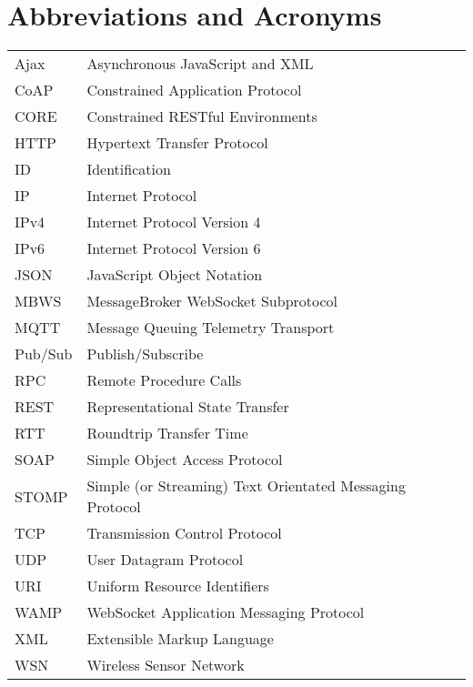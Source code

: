 \chapter*{Abbreviations and Acronyms}


\noindent
\begin{longtable}{@{}p{}p{}@{}}
Ajax & Asynchronous JavaScript and XML \\
CoAP & Constrained Application Protocol \\
CORE & Constrained RESTful Environments \\
HTTP & Hypertext Transfer Protocol \\
ID & Identification \\
IP & Internet Protocol \\
IPv4 & Internet Protocol Version 4 \\
IPv6 & Internet Protocol Version 6 \\
JSON & JavaScript Object Notation \\
MBWS & MessageBroker WebSocket Subprotocol \\
MQTT & Message Queuing Telemetry Transport \\
Pub/Sub & Publish/Subscribe \\
RPC & Remote Procedure Calls \\
REST & Representational State Transfer \\
RTT & Roundtrip Transfer Time \\
SOAP & Simple Object Access Protocol \\
STOMP & Simple (or Streaming) Text Orientated Messaging Protocol \\
TCP & Transmission Control Protocol \\
UDP & User Datagram Protocol \\
URI & Uniform Resource Identifiers \\
WAMP & WebSocket Application Messaging Protocol \\
XML & Extensible Markup Language \\
WSN & Wireless Sensor Network \\
\end{longtable}
